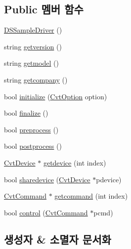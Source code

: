 \subsection*{Public 멤버 함수}
\begin{DoxyCompactItemize}
\item 
\hyperlink{classebiodriver_1_1DSSampleDriver_ab7b862bbc77a0ebdffde3931e1d889a3}{D\+S\+Sample\+Driver} ()
\item 
string \hyperlink{classebiodriver_1_1DSSampleDriver_ac2173224ee7e59f6386f9dab1a8cb4b6}{getversion} ()
\item 
string \hyperlink{classebiodriver_1_1DSSampleDriver_aa99ba3c94b288a61a07a73393fec0f81}{getmodel} ()
\item 
string \hyperlink{classebiodriver_1_1DSSampleDriver_a6c7281bb4d01245c1b5087a1fbcc2b80}{getcompany} ()
\item 
bool \hyperlink{classebiodriver_1_1DSSampleDriver_aaeb74b5cfe475ecdafe87279574fe6e4}{initialize} (\hyperlink{classstdcvt_1_1CvtOption}{Cvt\+Option} option)
\item 
bool \hyperlink{classebiodriver_1_1DSSampleDriver_a21e12d56a042bc9efee56f9af7e41f7c}{finalize} ()
\item 
bool \hyperlink{classebiodriver_1_1DSSampleDriver_af7463eb1268616f1f2e677d2ad56cf63}{preprocess} ()
\item 
bool \hyperlink{classebiodriver_1_1DSSampleDriver_aa5913df52706dd85fb4d3c0b8e4e5a92}{postprocess} ()
\item 
\hyperlink{classstdcvt_1_1CvtDevice}{Cvt\+Device} $\ast$ \hyperlink{classebiodriver_1_1DSSampleDriver_a3dcd13870509c3139c6c0ad7ba22cbed}{getdevice} (int index)
\item 
bool \hyperlink{classebiodriver_1_1DSSampleDriver_a027286ae7b53a82d8d46731cfabcfea3}{sharedevice} (\hyperlink{classstdcvt_1_1CvtDevice}{Cvt\+Device} $\ast$pdevice)
\item 
\hyperlink{classstdcvt_1_1CvtCommand}{Cvt\+Command} $\ast$ \hyperlink{classebiodriver_1_1DSSampleDriver_acfccb95870864ce6dc5f99ab94c214fa}{getcommand} (int index)
\item 
bool \hyperlink{classebiodriver_1_1DSSampleDriver_a0fe50dbf8dd10f4568f25e83e7e3e873}{control} (\hyperlink{classstdcvt_1_1CvtCommand}{Cvt\+Command} $\ast$pcmd)
\end{DoxyCompactItemize}


\subsection{생성자 \& 소멸자 문서화}
